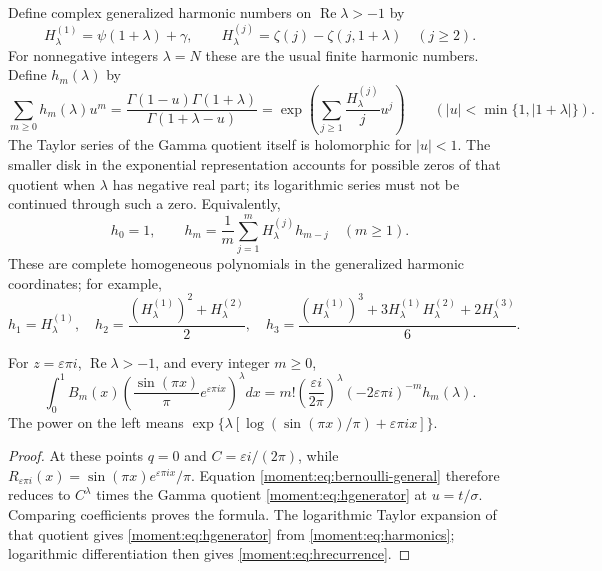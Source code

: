 Define complex generalized harmonic numbers on
$\operatorname{Re}\lambda>-1$ by
\begin{equation}\label{moment:eq:harmonics}
 H_\lambda^{(1)}=\psi(1+\lambda)+\gamma,
 \qquad
 H_\lambda^{(j)}=\zeta(j)-\zeta(j,1+\lambda)\quad(j\ge2).
\end{equation}
For nonnegative integers $\lambda=N$ these are the usual finite
harmonic numbers. Define $h_m(\lambda)$ by
\begin{equation}\label{moment:eq:hgenerator}
 \sum_{m\ge0}h_m(\lambda)u^m
 =\frac{\Gamma(1-u)\Gamma(1+\lambda)}
        {\Gamma(1+\lambda-u)}
 =\exp\left(\sum_{j\ge1}\frac{H_\lambda^{(j)}}j u^j\right)
 \qquad (|u|<\min\{1,|1+\lambda|\}).
\end{equation}
The Taylor series of the Gamma quotient itself is holomorphic for
$|u|<1$. The smaller disk in the exponential representation accounts
for possible zeros of that quotient when $\lambda$ has negative real
part; its logarithmic series must not be continued through such a zero.
Equivalently,
\begin{equation}\label{moment:eq:hrecurrence}
 h_0=1,\qquad
 h_m=\frac1m\sum_{j=1}^m H_\lambda^{(j)}h_{m-j}\quad(m\ge1).
\end{equation}
These are complete homogeneous polynomials in the generalized
harmonic coordinates; for example,
\[
 h_1=H_\lambda^{(1)},\quad
 h_2=\frac{(H_\lambda^{(1)})^2+H_\lambda^{(2)}}2,\quad
 h_3=\frac{(H_\lambda^{(1)})^3+
        3H_\lambda^{(1)}H_\lambda^{(2)}+2H_\lambda^{(3)}}6.
\]

\begin{theorem}
\label{moment:thm:bernoulli}
For $z=\varepsilon\pi i$, $\operatorname{Re}\lambda>-1$, and
every integer $m\ge0$,
\begin{equation}\label{moment:eq:allmoments}
 \boxed{\displaystyle
 \int_0^1 B_m(x)
  \left(\frac{\sin(\pi x)}\pi e^{\varepsilon\pi i x}\right)^\lambda dx
 =m!\left(\frac{\varepsilon i}{2\pi}\right)^\lambda
       (-2\varepsilon\pi i)^{-m}h_m(\lambda).}
\end{equation}
The power on the left means
$\exp\{\lambda[\log(\sin(\pi x)/\pi)+\varepsilon\pi i x]\}$.
\end{theorem}
\begin{proof}
At these points $q=0$ and $C=\varepsilon i/(2\pi)$, while
$R_{\varepsilon\pi i}(x)=\sin(\pi x)e^{\varepsilon\pi i x}/\pi$.
Equation \eqref{moment:eq:bernoulli-general} therefore reduces to
$C^\lambda$ times the Gamma quotient
\eqref{moment:eq:hgenerator} at $u=t/\sigma$. Comparing coefficients
proves the formula. The logarithmic Taylor expansion of that quotient
gives \eqref{moment:eq:hgenerator} from
\eqref{moment:eq:harmonics}; logarithmic differentiation then gives
\eqref{moment:eq:hrecurrence}.
\end{proof}

